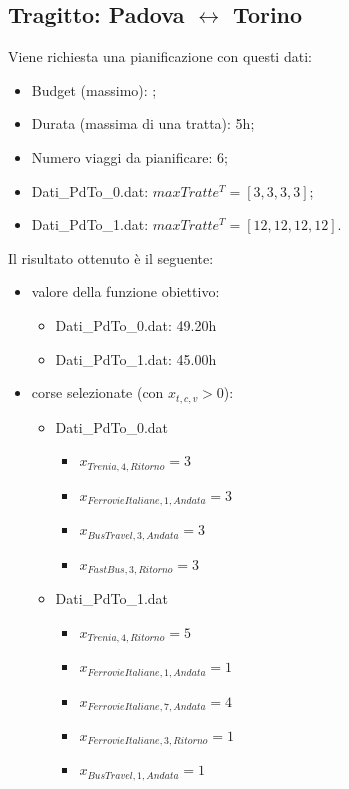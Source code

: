 \documentclass[main.tex]{subfiles}
\begin{document}
\subsection*{Tragitto: Padova $\leftrightarrow$ Torino}
Viene richiesta una pianificazione con questi dati:
\begin{itemize}
    \item Budget (massimo): ;
    \item Durata (massima di una tratta): 5h;
    \item Numero viaggi da pianificare: 6;
    \item Dati\_PdTo\_0.dat: $maxTratte^T = [3,3,3,3]$;
    \item Dati\_PdTo\_1.dat: $maxTratte^T = [12,12,12,12]$.
\end{itemize}
Il risultato ottenuto è il seguente:
\begin{itemize}
    \item valore della funzione obiettivo:
    \begin{itemize}
        \item Dati\_PdTo\_0.dat: 49.20h
        \item Dati\_PdTo\_1.dat: 45.00h
    \end{itemize}
    \item corse selezionate (con $x_{t,c,v} > 0$):
    \begin{itemize}
        \item Dati\_PdTo\_0.dat
        \begin{itemize}
            \item $x_{Trenia,4,Ritorno} = 3$
            \item $x_{FerrovieItaliane,1,Andata} = 3$
            \item $x_{BusTravel,3,Andata} = 3$
            \item $x_{FastBus,3,Ritorno} = 3$
        \end{itemize}
        \item Dati\_PdTo\_1.dat
        \begin{itemize}
            \item $x_{Trenia,4,Ritorno} = 5$
            \item $x_{FerrovieItaliane,1,Andata} = 1$
            \item $x_{FerrovieItaliane,7,Andata} = 4$
            \item $x_{FerrovieItaliane,3,Ritorno} = 1$
            \item $x_{BusTravel,1,Andata} = 1$
        \end{itemize}

\end{itemize}
\end{itemize}
\end{document}
